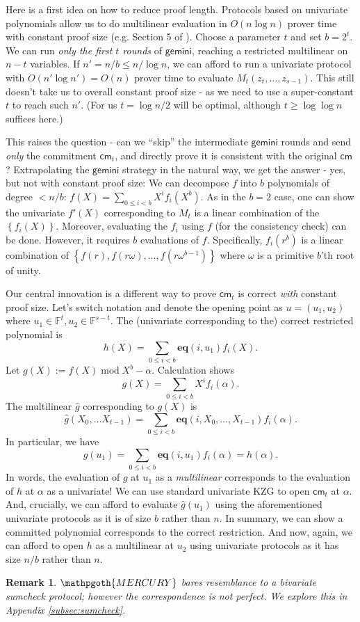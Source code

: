 \documentclass[11pt]{article} %
\newcommand{\gemini}{\ensuremath{\mathsf{gemini}}\xspace}
\newcommand{\mercury}{\ensuremath{\mathpgoth{MERCURY} }\xspace}
\newcommand{\F}{\ensuremath{\mathbb F}\xspace}
\newcommand{\cm}{\ensuremath{\mathsf{cm}}\xspace}
\newcommand{\defeq}{:=}
\renewcommand{\mod}{\ensuremath{\;\mathrm{mod}\;}}
\newcommand{\prv}{\ensuremath{\mathsf{\mathbf{P}}}\xspace}
\newcommand{\ver}{\ensuremath{\mathsf{\mathbf{V}}}\xspace}
\newcommand{\set}[1]{\ensuremath{\left\{#1\right\}}\xspace}
\newtheorem{remark}[lemma]{Remark}
\renewcommand{\g}{\ensuremath{\mathsf{g}}\xspace}
\newcommand{\eq}{\ensuremath{\mathsf{eq}}\xspace}
\renewcommand{\eq}{\ensuremath{\mathbf{eq}}\xspace}
\newcommand{\mle}[1]{\ensuremath{\hat{#1}}\xspace}
\begin{document}
Here is a first idea on how to reduce proof length.
Protocols based on univariate polynomials allow us to do multilinear evaluation in $O(n\log n)$ prover time with constant proof size (e.g. Section 5 of \cite{logupgkr}).
Choose a parameter $t$ and set $b=2^t$.
We can run \emph{only the first $t$ rounds} of \gemini, reaching a restricted multilinear on $n-t$ variables.
If $n'=n/b\leq n/\log n$, we can afford to run a univariate protocol with $O(n' \log n')=O(n)$ prover time to evaluate $M_t(z_t,\ldots,z_{s-1})$.
This still doesn't take us to overall constant proof size - as we  need to use a super-constant $t$ to reach such $n'$. (For us $t=\log n/2$ will be optimal, although $t\geq \log \log n$ suffices here.)


This raises the question - can we ``skip'' the intermediate \gemini rounds and send \emph{only} the commitment $\cm_t$, and directly prove it is consistent with the original \cm?
Extrapolating the \gemini strategy in the natural way, we get the answer - yes, but not with constant proof size:
We can decompose $f$ into $b$ polynomials of degree $<n/b$: $f(X)=\sum_{0\leq i <b} X^i f_i(X^b)$.
As in the $b=2$ case, one can show the univariate $f'(X)$ corresponding to $M_t$ is a linear combination
of the \set{f_i(X)}. Moreover, evaluating the $f_i$ using $f$ (for the consistency check) can be done.
However, it requires $b$ evaluations of $f$. Specifically,
$f_i(r^b)$ is a linear combination of  $\set{f(r),f(r\omega),\ldots,f(r\omega^{b-1})}$ where $\omega$ is a primitive $b$'th root of unity.


Our central innovation is a different way to prove $\cm_t$ is correct \emph{with} constant proof size.
Let's switch notation and denote the opening point as $u=(u_1,u_2)$ where $u_1\in \F^t,u_2\in \F^{s-t}$.
The (univariate corresponding to the) correct restricted polynomial is 
\[h(X) = \sum_{0\leq i < b} \eq(i,u_1)f_i(X).\]
Let $g(X)\defeq f(X) \mod X^b-\alpha$.
Calculation shows
\[g(X)= \sum_{0\leq i < b} X^i f_i(\alpha).\]
The multilinear $\mle{g}$ corresponding to $g(X)$ is 
\[\mle{g}(X_0,\ldots X_{t-1}) = \sum_{0\leq i < b} \eq(i,X_0,\ldots,X_{t-1})f_i(\alpha).
\]
In particular, we have 
\[\mle{g}(u_1) = \sum_{0\leq i < b} \eq(i,u_1)f_i(\alpha)=h(\alpha).\]
In words, the evaluation of $g$ at $u_1$ as a \emph{multilinear} corresponds to 
the evaluation of $h$ at $\alpha$ as a univariate!
We can use standard univariate KZG to open $\cm_t$ at $\alpha$.
And, crucially, we can afford to evaluate $\mle{g}(u_1)$ using the aforementioned univariate protocols as it is of size $b$ rather than $n$.
In summary, we can show a committed polynomial corresponds to the correct restriction. And now, again, we can afford to open $h$ as a multilinear at $u_2$ using univariate protocols
as it has size $n/b$ rather than $n$.
\begin{remark}
\mercury bares resemblance to a bivariate sumcheck protocol\cite{lfkn}; however the correspondence is not perfect. We explore this in Appendix \ref{subsec:sumcheck}.
\end{remark}
\end{document}
